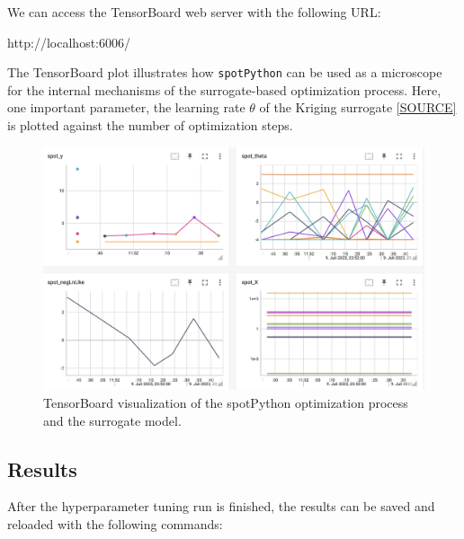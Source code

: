 \documentclass[
  letterpaper,
  DIV=11,
  numbers=noendperiod]{scrreprt}
\newenvironment{Shaded}{\begin{snugshade}}{\end{snugshade}}
\newcommand{\NormalTok}[1]{\textcolor[rgb]{0.00,0.23,0.31}{#1}}
\begin{document}
We can access the TensorBoard web server with the following URL:

\begin{Shaded}
\begin{Highlighting}[]
\NormalTok{http://localhost:6006/}
\end{Highlighting}
\end{Shaded}

The TensorBoard plot illustrates how \texttt{spotPython} can be used as
a microscope for the internal mechanisms of the surrogate-based
optimization process. Here, one important parameter, the learning rate
\(\theta\) of the Kriging surrogate
\href{https://github.com/sequential-parameter-optimization/spotPython/blob/main/src/spotPython/build/kriging.py}{{[}SOURCE{]}}
is plotted against the number of optimization steps.

\begin{figure}

{\centering \includegraphics[width=1\textwidth,height=\textheight]{figures_static/13_tensorboard_01.png}

}

\caption{TensorBoard visualization of the spotPython optimization
process and the surrogate model.}

\end{figure}

\hypertarget{results-6}{%
\subsection{Results}\label{results-6}}

After the hyperparameter tuning run is finished, the results can be
saved and reloaded with the following commands:
\end{document}
